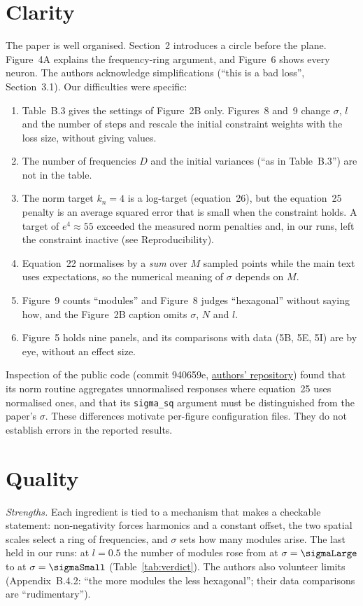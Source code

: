 \documentclass[10pt,letterpaper]{article}
\begin{document}
\section{Clarity}
The paper is well organised. Section~2 introduces a circle before the plane. Figure~4A explains the frequency-ring argument, and Figure~6 shows every neuron. The authors acknowledge simplifications (``this is a bad loss'', Section~3.1). Our difficulties were specific:
\begin{enumerate}[leftmargin=1.4em,itemsep=0pt,topsep=2pt,parsep=0pt]
\item Table~B.3 gives the settings of Figure~2B only. Figures~8 and~9 change $\sigma$, $l$ and the number of steps and rescale the initial constraint weights with the loss size, without giving values.
\item The number of frequencies $D$ and the initial variances (``as in Table~B.3'') are not in the table.
\item The norm target $k_n=4$ is a log-target (equation~26), but the equation~25 penalty is an average squared error that is small when the constraint holds. A target of $e^{4}\approx55$ exceeded the measured norm penalties and, in our runs, left the constraint inactive (see Reproducibility).
\item Equation~22 normalises by a \emph{sum} over $M$ sampled points while the main text uses expectations, so the numerical meaning of $\sigma$ depends on $M$.
\item Figure~9 counts ``modules'' and Figure~8 judges ``hexagonal'' without saying how, and the Figure~2B caption omits $\sigma$, $N$ and $l$.
\item Figure~5 holds nine panels, and its comparisons with data (5B, 5E, 5I) are by eye, without an effect size.
\end{enumerate}
Inspection of the public code (commit 940659e, \href{https://github.com/WilburDoz/ICLR_Actionable_Reps}{authors' repository}) found that its norm routine aggregates unnormalised responses where equation~25 uses normalised ones, and that its \texttt{sigma\_sq} argument must be distinguished from the paper's $\sigma$. These differences motivate per-figure configuration files. They do not establish errors in the reported results.

\section{Quality}
\emph{Strengths.} Each ingredient is tied to a mechanism that makes a checkable statement: non-negativity forces harmonics and a constant offset, the two spatial scales select a ring of frequencies, and $\sigma$ sets how many modules arise. The last held in our runs: at $l=0.5$ the number of modules rose from \sigmaLargeModules{} at $\sigma=\sigmaLarge$ to \sigmaSmallModules{} at $\sigma=\sigmaSmall$ (Table~\ref{tab:verdict}). The authors also volunteer limits (Appendix~B.4.2: ``the more modules the less hexagonal''; their data comparisons are ``rudimentary'').
\end{document}
